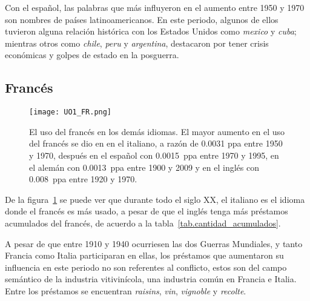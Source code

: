 Con el español, las palabras que más influyeron en el aumento entre 1950 y 1970 son nombres de países latinoamericanos. En este periodo, algunos de ellos tuvieron alguna relación histórica con los Estados Unidos como \textit{mexico} y \textit{cuba}; mientras otros como \textit{chile}, \textit{peru} y \textit{argentina}, destacaron por tener crisis económicas y golpes de estado en la posguerra.  
\label{D-EN}


 



\subsection{Francés} %

\begin{figure}[h!]
	\centering
	\texttt{[image: UO1\_FR.png]}
	\caption{El uso del francés en los demás idiomas. El mayor aumento en el uso del francés se dio en en el italiano, a razón de 0.0031 ppa entre 1950 y 1970, después en el español con 0.0015~ppa entre 1970 y 1995, en el alemán con 0.0013~ppa entre 1900 y 2009 y en el inglés con 0.008~ppa entre 1920 y 1970.}
	\label{fig.UO_FR}
\end{figure}

De la figura~\ref{fig.UO_FR} se puede ver que durante todo el siglo XX, el italiano es el idioma donde el francés es más usado, a pesar de que el inglés tenga más préstamos acumulados del francés, de acuerdo a la tabla~\ref{tab.cantidad_acumulados}. 


A pesar de que entre 1910 y 1940 ocurriesen las dos Guerras Mundiales, y tanto Francia como Italia participaran en ellas,  los préstamos que aumentaron su influencia en este periodo no son referentes al conflicto, estos son del campo semántico de la industria vitivinícola, una industria común en Francia e Italia. Entre los préstamos se encuentran \textit{raisins}, \textit{vin}, \textit{vignoble} y \textit{recolte}. 

